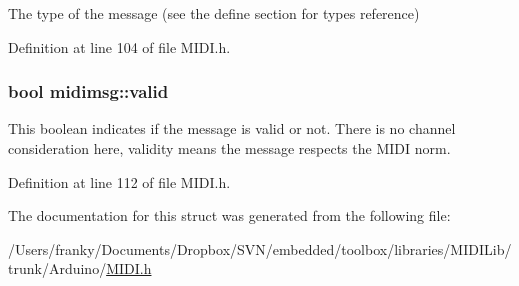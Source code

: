 The type of the message (see the define section for types reference) 

Definition at line 104 of file MIDI.h.\hypertarget{structmidimsg_dd91395b86cb7ace5ba8c1654ab61d2e}{
\subsubsection[{valid}]{\setlength{\rightskip}{0pt plus 5cm}bool {\bf midimsg::valid}}}
\label{structmidimsg_dd91395b86cb7ace5ba8c1654ab61d2e}


This boolean indicates if the message is valid or not. There is no channel consideration here, validity means the message respects the MIDI norm. 

Definition at line 112 of file MIDI.h.

The documentation for this struct was generated from the following file:\begin{CompactItemize}
\item 
/Users/franky/Documents/Dropbox/SVN/embedded/toolbox/libraries/MIDILib/trunk/Arduino/\hyperlink{_m_i_d_i_8h}{MIDI.h}\end{CompactItemize}
